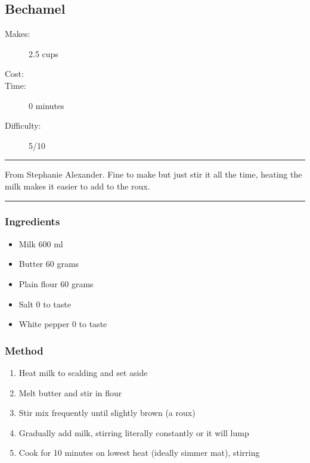 \documentclass[]{article}
\begin{document}
\subsection*{\center\huge Bechamel}
\begin{description}
\item[Makes:] 2.5 cups
\item[Cost:] \textdollar
\item[Time:] 0 minutes
\item[Difficulty:] 5/10
\end{description}
\vspace{0.2cm}\hrule\vspace{0.5cm}
\begin{adjustwidth}{0.5 cm}{0.5 cm}

From Stephanie Alexander. Fine to make but just stir it all the time, heating the milk makes it easier to add to the roux. \hfill\color{accent}{\Large\faVimeoSquare\hspace{0.1cm}\faTruck\hspace{0.1cm}}\color{black}

\end{adjustwidth}
\vspace{0.5cm}\hrule
\subsubsection*{\Large Ingredients}
\begin{multicols}{2}
\begin{itemize}
 \item Milk \hfill 600 ml
 \item Butter \hfill 60 grams
 \item Plain flour \hfill 60 grams
 \item Salt \hfill 0 to taste
 \item White pepper \hfill 0 to taste
\end{itemize}
\end{multicols}
\subsubsection*{\Large Method}
\begin{enumerate}[font=\huge\color{accent}]
	\item Heat milk to scalding and set aside
	\item Melt butter and stir in flour
	\item Stir mix frequently until slightly brown (a roux)
	\item Gradually add milk, stirring literally constantly or it will lump
	\item Cook for 10 minutes on lowest heat (ideally simmer mat), stirring
\end{enumerate}
\newpage
{}
\end{document}
